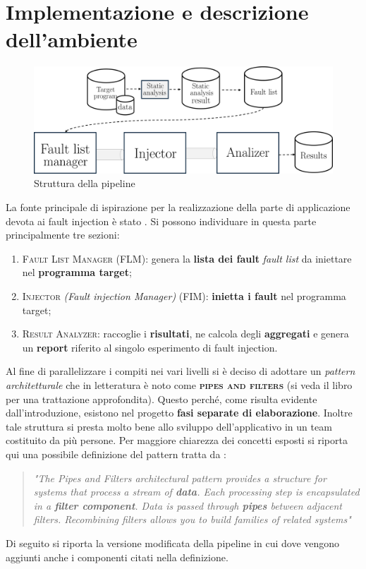 \section{Implementazione e descrizione dell'ambiente}\label{sec:Fault_Env}

\begin{figure}[h]
    \centering
    \includegraphics[scale=0.5]{img/pipeline.png}
    \caption{Struttura della pipeline}
\end{figure}

La fonte principale di ispirazione per la realizzazione della parte di applicazione devota ai fault injection è stato \cite{benso_fault_1998}.
Si possono individuare in questa parte principalmente tre sezioni: 
\begin{enumerate}
    \itemsep-0.3em
    \item \textsc{Fault List Manager} (FLM): genera la \textbf{lista dei fault} \textit{fault list} da iniettare nel \textbf{programma target}; 
    \item \textsc{Injector} \textit{(Fault injection Manager)} (FIM): \textbf{inietta i fault} nel programma target; 
    \item \textsc{Result Analyzer}: raccoglie i \textbf{risultati}, ne calcola degli \textbf{aggregati} e genera un \textbf{report} riferito al singolo esperimento di fault injection.
\end{enumerate}

Al fine di parallelizzare i compiti nei vari livelli si è deciso di adottare un \textit{pattern architetturale} che in letteratura è noto come \textbf{\textsc{pipes and filters}} (si veda il libro \cite{schmidt2013pattern} per una trattazione approfondita). Questo perché, come risulta evidente dall'introduzione, esistono nel progetto \textbf{fasi separate di elaborazione}. Inoltre tale struttura si presta molto bene allo sviluppo dell'applicativo in un team costituito da più persone. Per maggiore chiarezza dei concetti esposti si riporta qui una possibile definizione del pattern tratta da \cite{schmidt2013pattern}: 
\begin{quotation}
    \textit{
        \noindent
"The Pipes and Filters architectural pattern provides a structure for
systems that process a stream of \textbf{data}. Each processing step is
encapsulated in a \textbf{filter component}. Data is passed through \textbf{pipes}
between adjacent filters. Recombining filters allows you to build
families of related systems"}
\end{quotation}
Di seguito si riporta 
la versione modificata della pipeline in cui dove vengono aggiunti anche i componenti citati nella definizione. 


